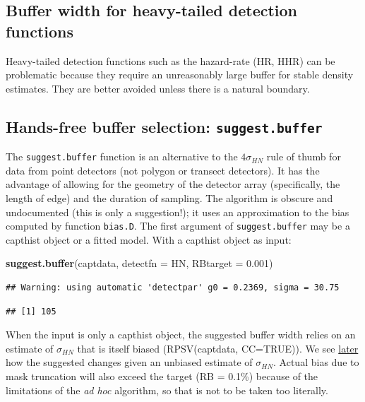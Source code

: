 \documentclass[
]{book}
\newenvironment{Shaded}{\begin{snugshade}}{\end{snugshade}}
\newcommand{\AttributeTok}[1]{\textcolor[rgb]{0.13,0.29,0.53}{#1}}
\newcommand{\FloatTok}[1]{\textcolor[rgb]{0.00,0.00,0.81}{#1}}
\newcommand{\FunctionTok}[1]{\textcolor[rgb]{0.13,0.29,0.53}{\textbf{#1}}}
\newcommand{\NormalTok}[1]{#1}
\newcommand{\StringTok}[1]{\textcolor[rgb]{0.31,0.60,0.02}{#1}}
\begin{document}
\subsection{Buffer width for heavy-tailed detection functions}\label{buffer-width-for-heavy-tailed-detection-functions}

Heavy-tailed detection functions such as the hazard-rate (HR, HHR) can be problematic because they require an unreasonably large buffer for stable density estimates. They are better avoided unless there is a natural boundary.

\subsection{\texorpdfstring{Hands-free buffer selection: \texttt{suggest.buffer}}{Hands-free buffer selection: suggest.buffer}}\label{hands-free-buffer-selection-suggest.buffer}

The \texttt{suggest.buffer} function is an alternative to the \(4\sigma_{HN}\) rule of thumb for data from point detectors (not polygon or transect detectors). It has the advantage of allowing for the geometry of the detector array (specifically, the length of edge) and the duration of sampling. The algorithm is obscure and undocumented (this is only a suggestion!); it uses an approximation to the bias computed by function \texttt{bias.D}. The first argument of \texttt{suggest.buffer} may be a capthist object or a fitted model. With a capthist object as input:

\begin{Shaded}
\begin{Highlighting}[]
\FunctionTok{suggest.buffer}\NormalTok{(captdata, }\AttributeTok{detectfn =} \StringTok{\textquotesingle{}HN\textquotesingle{}}\NormalTok{, }\AttributeTok{RBtarget =} \FloatTok{0.001}\NormalTok{)}
\end{Highlighting}
\end{Shaded}

\begin{verbatim}
## Warning: using automatic 'detectpar' g0 = 0.2369, sigma = 30.75
\end{verbatim}

\begin{verbatim}
## [1] 105
\end{verbatim}

When the input is only a capthist object, the suggested buffer width relies on an estimate of \(\sigma_{HN}\) that is itself biased (RPSV(captdata, CC=TRUE)). We see \hyperref[suggest]{later} how the suggested changes given an unbiased estimate of \(\sigma_{HN}\). Actual bias due to mask truncation will also exceed the target (RB = 0.1\%) because of the limitations of the \emph{ad hoc} algorithm, so that is not to be taken too literally.
\end{document}
